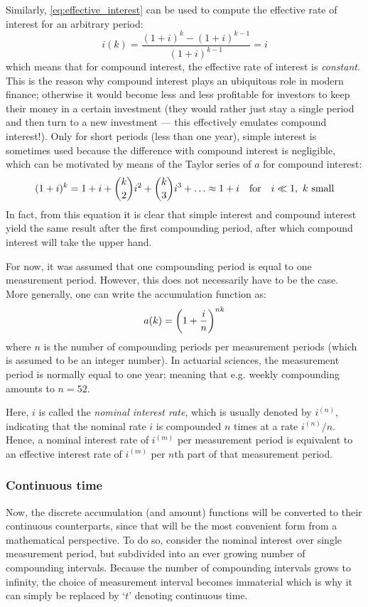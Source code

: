 Similarly, \cref{eq:effective_interest} can be used to compute the effective rate of interest for an arbitrary period:
\[
     i(k) = \frac{(1 + i)^k - (1 + i)^{k-1}}{(1 + i)^{k-1}} = i
\]
which means that for compound interest, the effective rate of interest is \emph{constant}. This is the reason why compound interest plays an ubiquitous role in modern finance; otherwise it would become less and less profitable for investors to keep  their money in a certain investment (they would rather just stay a single period and then turn to a new investment --- this effectively emulates compound interest!). Only for short periods (less than one year), simple interest is sometimes used because the difference with compound interest is negligible, which can be motivated by means of the Taylor series of \(a\) for compound interest: 
\[
     (1 + i)^k = 1 + i +  \binom{k}{2}i^2 + \binom{k}{3}i^3 + \ldots \approx 1 + i\qfor i \ll 1,\ k \text{ small}
\]
In fact, from this equation it is clear that simple interest and compound interest yield the same result after the first compounding period, after which compound interest will take the upper hand.

For now, it was assumed that one compounding period is equal to one measurement period. However, this does not necessarily have to be the case. More generally, one can write the accumulation function as:
\[
     a(k) = \qty(1 + \frac{i}{n})^{nk}
\]
where \(n\) is the number of compounding periods per measurement periods (which is assumed to be an integer number). In actuarial sciences, the measurement period is normally equal to one year; meaning that e.g. weekly compounding amounts to \(n = 52\).

Here, \(i\) is called the \emph{nominal interest rate}, which is usually denoted by \(i^{(n)}\), indicating that the nominal rate \(i\) is compounded \(n\) times at a rate \(i^{(n)}/n\). Hence, a nominal interest rate of \(i^{(m)}\) per measurement period is equivalent to an effective interest rate of \( i^{(m)}\) per \(n\)th part of that measurement period. 


\subsubsection{Continuous time}
Now, the discrete accumulation (and amount) functions will be converted to their continuous counterparts, since that will be the most convenient form from a mathematical perspective. To do so, consider the nominal interest over single measurement period, but subdivided into an ever growing number of compounding intervals. Because the number of compounding intervals grows to infinity, the choice of measurement interval becomes immaterial which is why it can simply be replaced by `\(t\)' denoting continuous time.

